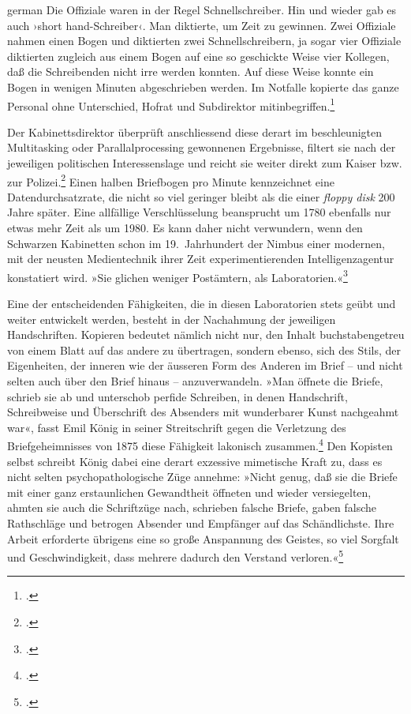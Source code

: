 \documentclass[a4paper,11pt]{article}
\newcommand{\anf}[1]{»#1«}
\newcommand{\inanf}[1]{›#1‹}
\newenvironment{zitat}{
\begin{foreigndisplayquote}{german}}%
{\end{foreigndisplayquote}}
\begin{document}
\begin{zitat}
Die Offiziale waren in der Regel Schnellschreiber. Hin und wieder gab es auch \inanf{short hand-Schreiber}. Man diktierte, um Zeit zu gewinnen. Zwei Offiziale nahmen einen Bogen und diktierten zwei Schnellschreibern, ja sogar vier Offiziale diktierten zugleich aus einem Bogen auf eine so geschickte Weise vier Kollegen, daß die Schreibenden nicht irre werden konnten. Auf diese Weise konnte ein Bogen in wenigen Minuten abgeschrieben werden. Im Notfalle kopierte das ganze Personal ohne Unterschied, Hofrat und Subdirektor mitinbegriffen.\footcite[139]{stix:1937}
\end{zitat}
Der Kabinettsdirektor überprüft anschliessend diese derart im beschleunigten Multitasking oder Parallalprocessing gewonnenen Ergebnisse, filtert sie nach der jeweiligen politischen Interessenslage und reicht sie weiter direkt zum Kaiser bzw. zur Polizei.\footcite[140]{stix:1937} Einen halben Briefbogen pro Minute kennzeichnet eine Datendurchsatzrate, die nicht so viel geringer bleibt als die einer \emph{floppy disk} 200 Jahre später. Eine allfällige Verschlüsselung beansprucht um 1780 ebenfalls nur etwas mehr Zeit als um 1980. Es kann daher nicht verwundern, wenn den Schwarzen Kabinetten schon im 19.~Jahrhundert der Nimbus einer modernen, mit der neusten Medientechnik ihrer Zeit experimentierenden Intelligenzagentur konstatiert wird. \anf{Sie glichen weniger Postämtern, als Laboratorien.}\footcite[40]{koenig:1875}

Eine der entscheidenden Fähigkeiten, die in diesen Laboratorien stets geübt und weiter entwickelt werden, besteht in der Nachahmung der jeweiligen Handschriften. Kopieren bedeutet nämlich nicht nur, den Inhalt buchstabengetreu von einem Blatt auf das andere zu übertragen, sondern ebenso, sich des Stils, der Eigenheiten, der inneren wie der äusseren Form des Anderen im Brief – und nicht selten auch über den Brief hinaus – anzuverwandeln. \anf{Man öffnete die Briefe, schrieb sie ab und unterschob perfide Schreiben, in denen Handschrift, Schreibweise und Überschrift des Absenders mit wunderbarer Kunst nachgeahmt war}, fasst Emil König in seiner Streitschrift gegen die Verletzung des Briefgeheimnisses von 1875 diese Fähigkeit lakonisch zusammen.\footcite[34]{koenig:1875} Den Kopisten selbst schreibt König dabei eine derart exzessive mimetische Kraft zu, dass es nicht selten psychopathologische Züge annehme: \anf{Nicht genug, daß sie die Briefe mit einer ganz erstaunlichen Gewandtheit öffneten und wieder versiegelten, ahmten sie auch die Schriftzüge nach, schrieben falsche Briefe, gaben falsche Rathschläge und betrogen Absender und Empfänger auf das Schändlichste. Ihre Arbeit erforderte übrigens eine so große Anspannung des Geistes, so viel Sorgfalt und Geschwindigkeit, dass mehrere dadurch den Verstand verloren.}\footcite[38]{koenig:1875} 
\end{document}
